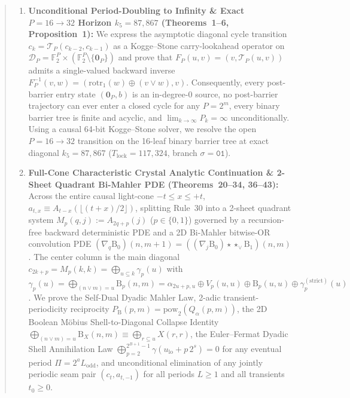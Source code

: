 \documentclass[11pt,a4paper]{article}
\theoremstyle{definition}
\theoremstyle{remark}
\newcommand{\Ftwo}{\mathbb{F}_2}
\newcommand{\rotr}{\mathrm{rotr}}
\newcommand{\powtwo}{\mathrm{pow}_2}
\begin{document}
\begin{abstract}
\begin{enumerate}
  \item \textbf{Unconditional Period-Doubling to Infinity \& Exact $P = 16 \to 32$ Horizon $k_5 = 87{,}867$ (Theorems~1--6, Proposition~1):} We express the asymptotic diagonal cycle transition $c_k = \mathcal{T}_P(c_{k-2}, c_{k-1})$ as a Kogge--Stone carry-lookahead operator on $\mathcal{D}_P = \Ftwo^P \times (\Ftwo^P \setminus \{\mathbf{0}_P\})$ and prove that $F_P(u,v) = (v, \mathcal{T}_P(u,v))$ admits a single-valued backward inverse $F_P^{-1}(v,w) = (\rotr_1(w) \oplus (v \lor w), v)$. Consequently, every post-barrier entry state $(\mathbf{0}_P, b)$ is an in-degree-$0$ source, no post-barrier trajectory can ever enter a closed cycle for any $P = 2^m$, every binary barrier tree is finite and acyclic, and $\lim_{k\to\infty} P_k = \infty$ unconditionally. Using a causal 64-bit Kogge--Stone solver, we resolve the open $P = 16 \to 32$ transition on the 16-leaf binary barrier tree at exact diagonal $k_5 = 87{,}867$ ($T_{\mathrm{lock}} = 117{,}324$, branch $\sigma = \mathtt{01}$).
  \item \textbf{Full-Cone Characteristic Crystal Analytic Continuation \& 2-Sheet Quadrant Bi-Mahler PDE (Theorems~20--34, 36--43):} Across the entire causal light-cone $-t \le x \le +t$, $a_{t,x} \equiv A_{t-x}(\lfloor(t+x)/2\rfloor)$, splitting Rule~30 into a 2-sheet quadrant system $M_p(q,j) := A_{2q+p}(j)$ ($p \in \{0,1\}$) governed by a recursion-free backward deterministic PDE and a 2D Bi-Mahler bitwise-OR convolution PDE $(\nabla_q \mathrm{B}_0)(n,m+1) = ((\nabla_j \mathrm{B}_0) \star\star_{\lor} \mathrm{B}_1)(n,m)$. The center column is the main diagonal $c_{2k+p} = M_p(k,k) = \bigoplus_{u \subseteq k} \gamma_p(u)$ with $\gamma_p(u) = \bigoplus_{(n \lor m)=u} \mathrm{B}_p(n,m) = \alpha_{2u+p,u} \oplus V_p(u,u) \oplus \mathrm{B}_p(u,u) \oplus \gamma_p^{(\mathrm{strict})}(u)$. We prove the Self-Dual Dyadic Mahler Law, 2-adic transient-periodicity reciprocity $P_{\mathrm{B}}(p,m) = \powtwo(Q_\alpha(p,m))$, the 2D Boolean M\"obius Shell-to-Diagonal Collapse Identity $\bigoplus_{(n \lor m)=u} \mathrm{B}_X(n,m) \equiv \bigoplus_{r \subseteq u} X(r,r)$, the Euler--Fermat Dyadic Shell Annihilation Law $\bigoplus_{p=2}^{2^{B+1}-1} \gamma(u_{\mathrm{lo}} + p\,2^s) = 0$ for any eventual period $\Pi = 2^a L_{\mathrm{odd}}$, and unconditional elimination of any jointly periodic seam pair $(c_t, a_{t,-1})$ for all periods $L \ge 1$ and all transients $t_0 \ge 0$.

\end{enumerate}
\end{abstract}
\end{document}
